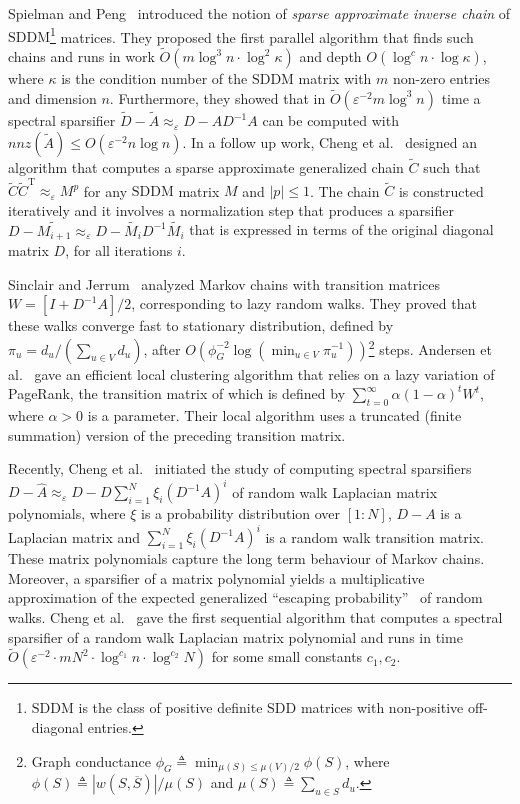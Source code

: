\documentclass[11pt]{article}
\newcommand{\SDDM}{\mathrm{SDDM}}
\newcommand{\SDD}{\mathrm{SDD}}
\newcommand{\wD}{\widetilde{D}}
\newcommand{\wA}{\widetilde{A}}
\newcommand{\wO}{\widetilde{O}}
\newcommand{\hA}{\widehat{A}}
\newcommand{\Di}{D^{-1}}
\newcommand{\rot}{\mathrm{T}}
\newcommand{\eps}{\epsilon}
\renewcommand{\leq}{\leqslant}
\renewcommand{\eps}{\varepsilon}
\numberwithin{thm}{section}
\begin{document}
Spielman and Peng~\cite{PS14} introduced the notion of
\emph{sparse approximate inverse chain} of $\SDDM$\footnote{$\SDDM$ is the class of positive definite $\SDD$ matrices with non-positive off-diagonal entries.} matrices. They proposed the first parallel algorithm that finds such chains and runs in work $\wO(m\log^{3}n\cdot\log^{2}\kappa)$ and depth $O(\log^{c}n\cdot\log\kappa)$, where $\kappa$
is the condition number of the $\SDDM$ matrix with $m$ non-zero entries and dimension $n$. Furthermore, they showed that in $\wO(\eps^{-2}m\log^{3}n)$
 time a spectral sparsifier $\wD-\wA\approx_{\eps}D-A\Di A$
can be computed with $nnz(\wA)\leq O(\eps^{-2}n\log n)$.
In a follow up work, Cheng et al.~\cite{CCLPT14} designed an algorithm that computes a sparse approximate generalized chain $\widetilde{C}$ such that
$\widetilde{C}\widetilde{C}^{\rot}\approx_{\eps}M^{p}$ for any $\SDDM$ matrix $M$ and $|p|\leq1$. The chain $\widetilde{C}$ is constructed iteratively and it involves a normalization step that produces a sparsifier $D-\widetilde{M_{i+1}}\approx_{\eps}D-\widetilde{M_{i}}\Di \widetilde{M_{i}}$ that is expressed in terms of the original diagonal matrix $D$, for all iterations $i$.

Sinclair and Jerrum~\cite{SJ89} analyzed Markov chains with transition matrices $W=[I+\Di A]/2$, corresponding to lazy random walks. They proved that these walks converge fast to stationary distribution, defined by $\pi_u=d_u/(\sum_{u\in V}d_u)$, after $O(\phi_{G}^{-2}\log(\min_{u\in V}\pi_u^{-1}))$\footnote{Graph conductance $\phi_{G}\triangleq\min_{\mu(S)\leq \mu(V)/2}\phi(S)$, where $\phi(S)\triangleq|w(S,\overline{S})|/\mu(S)$ and $\mu(S)\triangleq\sum_{u\in S}d_u$. } steps. Andersen et al.~\cite{ACL06} gave an efficient local clustering algorithm that relies on a lazy variation of PageRank, the transition matrix of which is defined by $\sum_{t=0}^{\infty}\alpha(1-\alpha)^{t}W^t$, where $\alpha>0$ is a parameter. Their local algorithm uses a truncated (finite summation) version of the preceding transition matrix.

Recently, Cheng et al.~\cite{CCLPT15} initiated the study of computing spectral sparsifiers $D-\hA\approx_{\eps}D-D\sum_{i=1}^{N}\xi_{i}(\Di A)^{i}$ of random walk Laplacian matrix polynomials, where $\xi$ is a probability distribution over $[1:N]$, $D-A$ is a Laplacian matrix and $\sum_{i=1}^{N}\xi_{i}(\Di A)^{i}$ is a random walk transition matrix. These matrix polynomials capture the long term behaviour of Markov chains. Moreover, a sparsifier of a matrix polynomial yields a multiplicative approximation of the expected generalized ``escaping probability''~\cite{OT12,KS14} of random walks. Cheng et al.~\cite{CCLPT15} gave the first sequential algorithm that computes a spectral sparsifier of a random walk Laplacian matrix polynomial and runs in time $\wO(\eps^{-2}\cdot mN^{2}\cdot\log^{c_{1}}n\cdot\log^{c_{2}}N)$ for some small constants $c_{1},c_{2}$.
\end{document}
